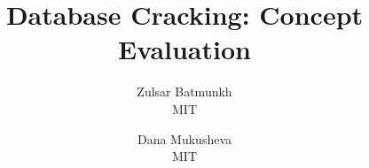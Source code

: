\documentclass[widereview]{vgtc}             %
\title{Database Cracking: Concept Evaluation}
\author{Zulsar Batmunkh\\
	\scriptsize MIT 
	\and Dana Mukusheva\\
	\scriptsize MIT 
	}
\begin{document}
\maketitle









%
%

{}

%
%
\end{document}

